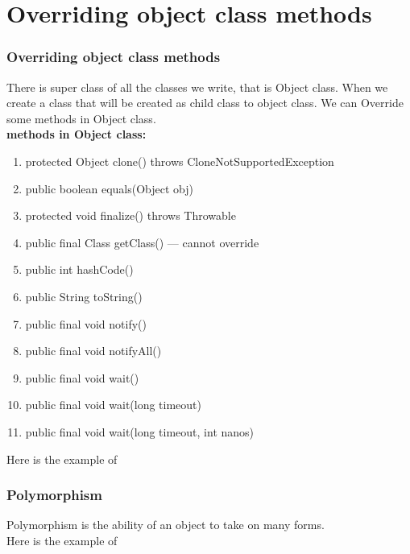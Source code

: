 \documentclass{beamer}
\begin{document}
\section{Overriding object class methods}
\begin{frame}
    \frametitle{Overriding object class methods}
    There is super class of all the classes we write, that is Object class. When we create a class that will be created as child class to object class. We can Override some methods in Object class.\\
    \textbf{methods in Object class:}\\
    \begin{enumerate}
        \item  protected Object clone() throws CloneNotSupportedException 
        \item public boolean equals(Object obj)
        \item protected void finalize() throws Throwable 
        \item public final Class getClass() --- cannot override 
        \item public int hashCode() 
        \item public String toString() 
        \item public final void notify() 
        \item public final void notifyAll() 
        \item public final void wait() 
        \item public final void wait(long timeout) 
        \item public final void wait(long timeout, int nanos)
    \end{enumerate}
    Here is the example of \href{Override_object.java}{\color{green}{Overriding Object class methods}} 
\end{frame}
\begin{frame}
    \frametitle{Polymorphism}
    Polymorphism is the ability of an object to take on many forms.\\

    Here is the example of \href{polymorphism.java}{\color{green}{Polymorphism}}
\end{frame}
\end{document}
